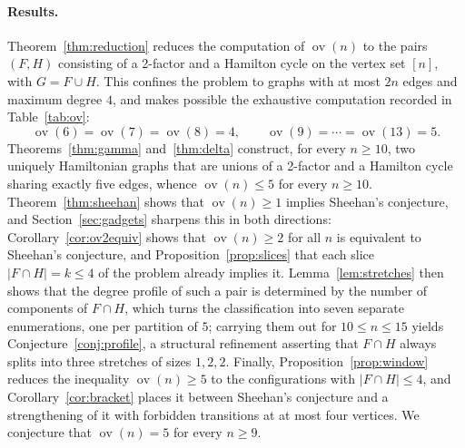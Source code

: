\documentclass[11pt,a4paper]{article}
\theoremstyle{definition}
\theoremstyle{remark}
\newcommand{\ov}{\operatorname{ov}}
\begin{document}
\paragraph{Results.} Theorem~\ref{thm:reduction} reduces the computation of $\ov(n)$ to the pairs $(F,H)$ consisting of a 2-factor and a Hamilton cycle on the vertex set $[n]$, with $G=F\cup H$. This confines the problem to graphs with at most $2n$ edges and maximum degree $4$, and makes possible the exhaustive computation recorded in Table~\ref{tab:ov}:
\[
\ov(6)=\ov(7)=\ov(8)=4,\qquad \ov(9)=\cdots=\ov(13)=5 .
\]
Theorems~\ref{thm:gamma} and~\ref{thm:delta} construct, for every $n\ge10$, two uniquely Hamiltonian graphs that are unions of a 2-factor and a Hamilton cycle sharing exactly five edges, whence $\ov(n)\le5$ for every $n\ge10$. Theorem~\ref{thm:sheehan} shows that $\ov(n)\ge1$ implies Sheehan's conjecture, and Section~\ref{sec:gadgets} sharpens this in both directions: Corollary~\ref{cor:ov2equiv} shows that $\ov(n)\ge2$ for all $n$ is equivalent to Sheehan's conjecture, and Proposition~\ref{prop:slices} that each slice $|F\cap H|=k\le4$ of the problem already implies it. Lemma~\ref{lem:stretches} then shows that the degree profile of such a pair is determined by the number of components of $F\cap H$, which turns the classification into seven separate enumerations, one per partition of $5$; carrying them out for $10\le n\le15$ yields Conjecture~\ref{conj:profile}, a structural refinement asserting that $F\cap H$ always splits into three stretches of sizes $1,2,2$. Finally, Proposition~\ref{prop:window} reduces the inequality $\ov(n)\ge5$ to the configurations with $|F\cap H|\le4$, and Corollary~\ref{cor:bracket} places it between Sheehan's conjecture and a strengthening of it with forbidden transitions at at most four vertices. We conjecture that $\ov(n)=5$ for every $n\ge9$.
\end{document}
